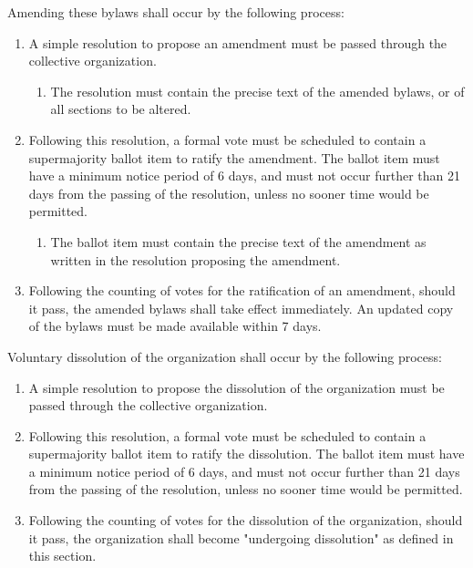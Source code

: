 \documentclass[11pt]{article}
\newcounter{h1}
\newcounter{h2}[h1]
\newcounter{h3}[h2]
\begin{document}

Amending these bylaws shall occur by the following process:

\begin{enumerate}
  \item A simple resolution to propose an amendment must be passed through the collective organization.  
  \begin{enumerate}
    \item The resolution must contain the precise text of the amended bylaws, or of all sections to be altered.  
  \end{enumerate}
  \item Following this resolution, a formal vote must be scheduled to contain a supermajority ballot item to ratify the amendment. The ballot item must have a minimum notice period of 6 days, and must not occur further than 21 days from the passing of the resolution, unless no sooner time would be permitted.  
  \begin{enumerate}
    \item The ballot item must contain the precise text of the amendment as written in the resolution proposing the amendment.  
  \end{enumerate}
  \item Following the counting of votes for the ratification of an amendment, should it pass, the amended bylaws shall take effect immediately. An updated copy of the bylaws must be made available within 7 days.
\end{enumerate}



Voluntary dissolution of the organization shall occur by the following process:

\begin{enumerate}
  \item A simple resolution to propose the dissolution of the organization must be passed through the collective organization.  
  \item Following this resolution, a formal vote must be scheduled to contain a supermajority ballot item to ratify the dissolution. The ballot item must have a minimum notice period of 6 days, and must not occur further than 21 days from the passing of the resolution, unless no sooner time would be permitted.  
  \item Following the counting of votes for the dissolution of the organization, should it pass, the organization shall become "undergoing dissolution" as defined in this section.
\end{enumerate}
\end{document}

